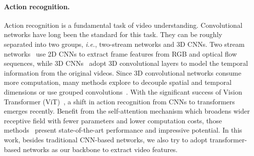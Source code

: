 \documentclass[final]{cvpr}
\newcommand{\iie}{\emph{i.e.}}
\begin{document}
\paragraph{Action recognition.}
Action recognition is a fundamental task of video understanding.
Convolutional networks have long been the standard for this task.
They can be roughly separated into two groups, \iie, two-stream networks and 3D CNNs. 
Two stream networks~\cite{simonyan2014two,feichtenhofer2016convolutional,wang2016temporal,wu2019convolutional} use 2D CNNs to extract frame features from RGB and optical flow sequences, while 
3D CNNs~\cite{tran2015learning,carreira2017quo,qiu2017learning,feichtenhofer2019slowfast,li2020spatio} adopt 3D convolutional layers to model the temporal information from the original videos. 
Since 3D convolutional networks consume more computation, many methods explore to decouple spatial and temporal dimensions or use grouped convolutions~\cite{sun2015human,tran2019video,tran2018closer,xie2018rethinking,feichtenhofer2020x3d}. 
With the significant success of Vision Transformer (ViT)~\cite{dosovitskiy2020image}, a shift in action recognition from CNNs to transformers emerges recently. Benefit from the self-attention mechanism which broadens wider receptive field with fewer parameters and lower computation costs, those methods~\cite{DBLP:conf/icml/BertasiusWT21,DBLP:journals/corr/abs-2103-15691,DBLP:journals/corr/abs-2106-13230,DBLP:journals/corr/abs-2104-11227,DBLP:journals/corr/abs-2108-11575,DBLP:journals/corr/abs-2106-11297} present state-of-the-art performance and impressive potential.
In this work, besides traditional CNN-based networks, we also try to adopt transformer-based networks as our backbone to extract video features.
\vspace{-5mm}
\end{document}
